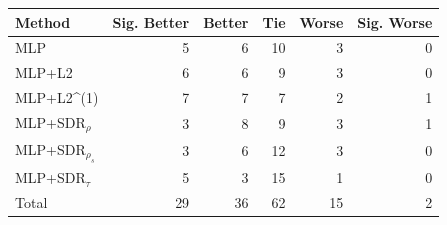 \begin{tabular}{lrrrrr}
\toprule
Method & Sig. Better & Better & Tie & Worse & Sig. Worse \\
\midrule
MLP & 5 & 6 & 10 & 3 & 0 \\
MLP+L2 & 6 & 6 & 9 & 3 & 0 \\
MLP+L2^{(1)} & 7 & 7 & 7 & 2 & 1 \\
MLP+SDR$_{\rho}$ & 3 & 8 & 9 & 3 & 1 \\
MLP+SDR$_{\rho_s}$ & 3 & 6 & 12 & 3 & 0 \\
MLP+SDR$_{\tau}$ & 5 & 3 & 15 & 1 & 0 \\
Total & 29 & 36 & 62 & 15 & 2 \\
\bottomrule
\end{tabular}
